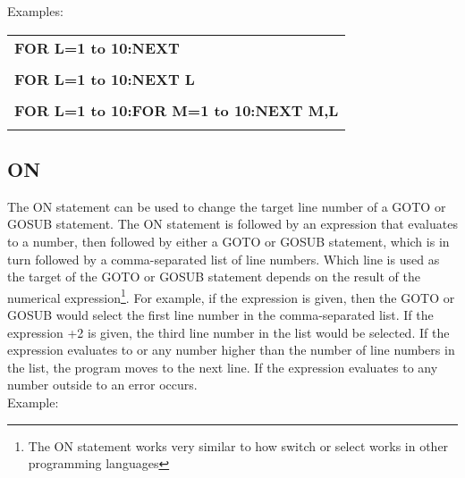  Examples:\\

\begin{tabular}{l}

	{\ttfamily\bfseries FOR L=1 to 10:NEXT}\\\\

	{\ttfamily\bfseries FOR L=1 to 10:NEXT L}\\\\

	{\ttfamily\bfseries FOR L=1 to 10:FOR M=1 to 10:NEXT M,L}\\\\

\end{tabular}

\vspace{16pt}

\subsection{ON}

The {\ttfamily ON} statement can be used to change the target line number of a
{\ttfamily GOTO} or {\ttfamily GOSUB} statement.  The {\ttfamily ON} statement
is followed by an expression that evaluates to a number, then followed by
either a {\ttfamily GOTO} or {\ttfamily GOSUB} statement, which is in turn
followed by a comma-separated list of line numbers.  Which line is used as the
target of the {\ttfamily GOTO} or {\ttfamily GOSUB} statement depends on the
result of the numerical expression\footnote{The {\ttfamily ON} statement works
very similar to how {\ttfamily switch} or {\ttfamily select} works in other
programming languages}.  For example, if the expression {} is given,
then the {\ttfamily GOTO} or {\ttfamily GOSUB} would select the first line
number in the comma-separated list.  If the expression {+2} is
given, the third line number in the list would be selected.  If the expression
evaluates to {} or any number higher than the number of line numbers
in the list, the program moves to the next line.  If the expression evaluates
to any number outside {} to {} an error occurs.\\

Example:\\


